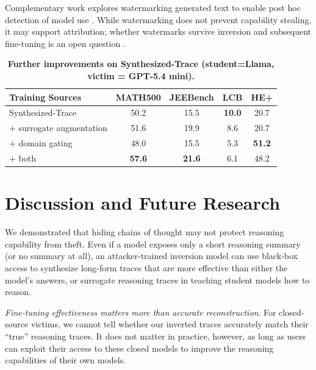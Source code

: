 \documentclass{article}
\begin{document}
Complementary work explores watermarking generated text to enable post hoc detection of model use \citep{kirchenbauer2023watermark,gu2023learnability,sander2024watermarking}. While watermarking does not prevent capability stealing, it may support attribution; whether watermarks survive inversion and subsequent fine-tuning is an open question \citep{sander2024watermarking}.

\begin{table}[t]
  \centering
  \caption{\textbf{Further improvements on Synthesized-Trace (student=Llama, victim = GPT-5.4 mini).}}
  \label{tab:gpt_further_improvements}
  \small
  \begin{tabular}{l
  S[table-format=2.1] S[table-format=2.1]
  S[table-format=2.1] S[table-format=2.1]}
    \toprule
    \textbf{Training Sources} & {\textbf{MATH500}} & {\textbf{JEEBench}}  & {\textbf{LCB}} & {\textbf{HE+}}\\
    \midrule
    Synthesized-Trace & 50.2 & 15.5 & \textbf{10.0} & 20.7 \\
    $+$ surrogate augmentation  & 51.6 & 19.9 & 8.6 & 20.7 \\
    $+$ domain gating & 48.0 & 15.5 & 5.3& \textbf{51.2}  \\
    $+$ both & \textbf{57.6} & \textbf{21.6}& 6.1 & 48.2  \\
    \bottomrule
  \end{tabular}
\end{table}


\section{Discussion and Future Research}
\label{sec:discussion}
We demonstrated that hiding chains of thought may not protect reasoning capability from theft.  Even if a model exposes only a short reasoning summary (or no summary at all), an attacker-trained inversion model can use black-box access to synthesize long-form traces that are more effective than either the model's answers, or surrogate reasoning traces in teaching student models how to reason.

\emph{Fine-tuning effectiveness matters more than accurate reconstruction}.  For closed-source victims, we cannot tell whether our inverted traces accurately match their ``true'' reasoning traces.  It does not matter in practice, however,  as long as users can exploit their access to these closed models to improve the reasoning capabilities of their own models.
\end{document}
